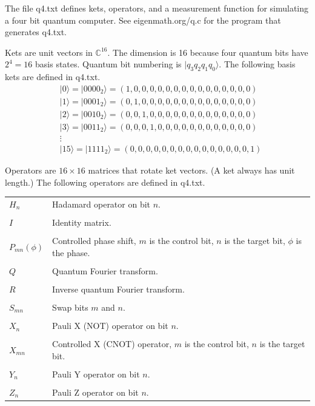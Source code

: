 \documentclass[12pt]{article}
\begin{document}
\noindent
The file q4.txt defines kets, operators, and a measurement function
for simulating a four bit quantum computer.
See eigenmath.org/q.c for the program that generates q4.txt.

\bigskip
\noindent
Kets are unit vectors in $\mathbb{C}^{16}$.
The dimension is 16 because four quantum bits have $2^4=16$ basis states.
Quantum bit numbering is $|q_3 q_2 q_1 q_0\rangle$.
The following basis kets are defined in q4.txt.
\begin{align*}
&|0\rangle=|0000_2\rangle=(1,0,0,0,0,0,0,0,0,0,0,0,0,0,0,0)
\\
&|1\rangle=|0001_2\rangle=(0,1,0,0,0,0,0,0,0,0,0,0,0,0,0,0)
\\
&|2\rangle=|0010_2\rangle=(0,0,1,0,0,0,0,0,0,0,0,0,0,0,0,0)
\\
&|3\rangle=|0011_2\rangle=(0,0,0,1,0,0,0,0,0,0,0,0,0,0,0,0)
\\
&\vdots
\\
&|15\rangle=|1111_2\rangle=(0,0,0,0,0,0,0,0,0,0,0,0,0,0,0,1)
\end{align*}

\noindent
Operators are $16\times16$ matrices that rotate ket vectors.
(A ket always has unit length.)
The following operators are defined in q4.txt.

\bigskip
\begin{tabular}{l l}
$H_n$ & Hadamard operator on bit $n$.
\\
\\
$I$ & Identity matrix.
\\
\\
$P_{mn}(\phi)$ & Controlled phase shift, $m$ is the control bit, $n$ is the target bit, $\phi$ is the phase.
\\
\\
$Q$ & Quantum Fourier transform.
\\
\\
$R$ & Inverse quantum Fourier transform.
\\
\\
$S_{mn}$ & Swap bits $m$ and $n$.
\\
\\
$X_n$ & Pauli X (NOT) operator on bit $n$.
\\
\\
$X_{mn}$ & Controlled X (CNOT) operator, $m$ is the control bit, $n$ is the target bit.
\\
\\
$Y_n$ & Pauli Y operator on bit $n$.
\\
\\
$Z_n$ & Pauli Z operator on bit $n$.
\end{tabular}
\end{document}

